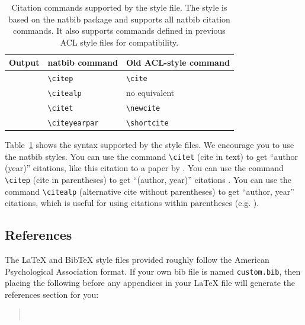 \documentclass[11pt]{article}
\begin{document}
\begin{table}
\centering
\begin{tabular}{lll}
\hline
\textbf{Output} & \textbf{natbib command} & \textbf{Old ACL-style command}\\
\hline
\citep{Gusfield:97} & \verb|\citep| & \verb|\cite| \\
\citealp{Gusfield:97} & \verb|\citealp| & no equivalent \\
\citet{Gusfield:97} & \verb|\citet| & \verb|\newcite| \\
\citeyearpar{Gusfield:97} & \verb|\citeyearpar| & \verb|\shortcite| \\
\hline
\end{tabular}
\caption{\label{citation-guide}
Citation commands supported by the style file.
The style is based on the natbib package and supports all natbib citation commands.
It also supports commands defined in previous ACL style files for compatibility.
}
\end{table}

Table~\ref{citation-guide} shows the syntax supported by the style files.
We encourage you to use the natbib styles.
You can use the command \verb|\citet| (cite in text) to get ``author (year)'' citations, like this citation to a paper by \citet{Gusfield:97}.
You can use the command \verb|\citep| (cite in parentheses) to get ``(author, year)'' citations \citep{Gusfield:97}.
You can use the command \verb|\citealp| (alternative cite without parentheses) to get ``author, year'' citations, which is useful for using citations within parentheses (e.g. \citealp{Gusfield:97}).

\subsection{References}

\nocite{Ando2005,borschinger-johnson-2011-particle,andrew2007scalable,rasooli-tetrault-2015,goodman-etal-2016-noise,harper-2014-learning}

The \LaTeX{} and Bib\TeX{} style files provided roughly follow the American Psychological Association format.
If your own bib file is named \texttt{custom.bib}, then placing the following before any appendices in your \LaTeX{} file will generate the references section for you:
\begin{quote}
\begin{verbatim}


\end{verbatim}
\end{quote}
\end{document}
